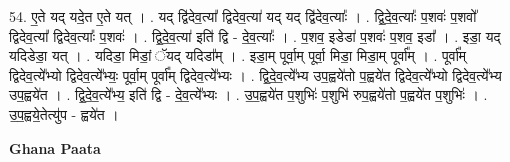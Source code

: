 \documentclass[17pt]{extarticle}
\begin{document}
54. ए॒ते यद् यदे॒त ए॒ते यत् । . यद् द्वि॑देव॒त्या᳚ द्विदेव॒त्या॑ यद् यद् द्वि॑देव॒त्याः᳚ । . द्वि॒दे॒व॒त्याः᳚ प॒शवः॑ प॒शवो᳚ द्विदेव॒त्या᳚ द्विदेव॒त्याः᳚ प॒शवः॑ । . द्वि॒दे॒व॒त्या॑ इति॑ द्वि - दे॒व॒त्याः᳚ । . प॒शव॒ इडेडा॑ प॒शवः॑ प॒शव॒ इडा᳚ । . इडा॒ यद् यदिडेडा॒ यत् । . यदिडा॒ मिडां॒ ॅयद् यदिडा᳚म् । . इडा॒म् पूर्वा॒म् पूर्वा॒ मिडा॒ मिडा॒म् पूर्वा᳚म् । . पूर्वा᳚म् द्विदेव॒त्ये᳚भ्यो द्विदेव॒त्ये᳚भ्यः॒ पूर्वा॒म् पूर्वा᳚म् द्विदेव॒त्ये᳚भ्यः । . द्वि॒दे॒व॒त्ये᳚भ्य उप॒ह्वये॑तो प॒ह्वये॑त द्विदेव॒त्ये᳚भ्यो द्विदेव॒त्ये᳚भ्य उप॒ह्वये॑त । . द्वि॒दे॒व॒त्ये᳚भ्य॒ इति॑ द्वि - दे॒व॒त्ये᳚भ्यः । . उ॒प॒ह्वये॑त प॒शुभिः॑ प॒शुभि॑ रुप॒ह्वये॑तो प॒ह्वये॑त प॒शुभिः॑ । . उ॒प॒ह्वये॒तेत्यु॑प - ह्वये॑त । \newline

\textbf{Ghana Paata } \newline
\end{document}
